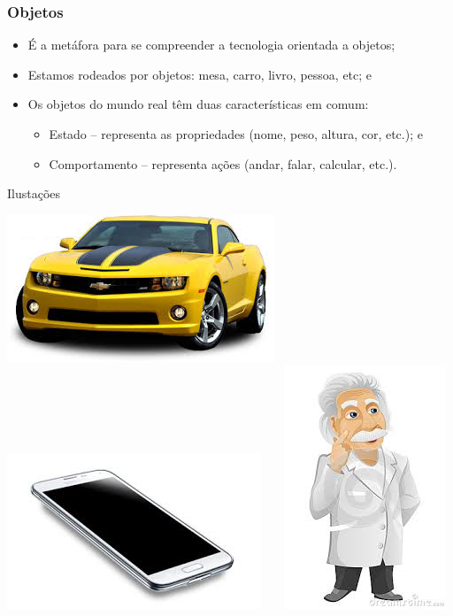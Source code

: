 \documentclass{beamer}
\begin{document}
\begin{frame}
	\frametitle{Objetos}
	
	\begin{itemize}
		\item É a metáfora para se compreender a tecnologia orientada a objetos;
		\item Estamos rodeados por objetos: mesa, carro, livro, pessoa, etc; e
		\item Os objetos do mundo real têm duas características em comum:
		\begin{itemize}
			\item Estado -- representa as propriedades (nome, peso, altura, cor, etc.); e
			\item Comportamento -- representa ações (andar, falar, calcular, etc.).
		\end{itemize}
	\end{itemize} \vfill
	
	\begin{exampleblock}{Ilustações}
		\begin{center}
			\includegraphics[scale=0.3]{./imagens/carro}~~~
			\includegraphics[scale=0.3]{./imagens/celular}~~~
			\includegraphics[scale=0.3]{./imagens/pessoa}
		\end{center}
	\end{exampleblock}
\end{frame}
\end{document}
